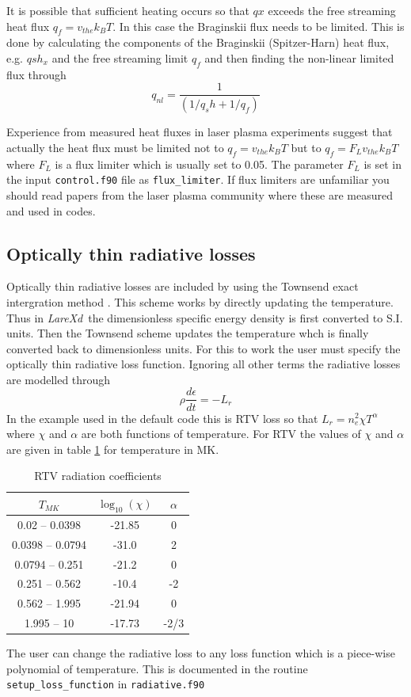 \documentclass[11pt]{article}
\newcommand{\lare}{{\it LareXd}\ }
\begin{document}
It is possible that sufficient heating occurs so that $qx$ exceeds the free streaming heat flux $q_f=v_{the} k_B T$. 
In this case the Braginskii flux needs to be limited. This is done by calculating the components of the Braginskii 
(Spitzer-Harn) heat flux, e.g. $qsh_x$ and the free streaming limit $q_f$ and then finding the non-linear limited flux through
\[
q_{nl} = \frac{1}{(1/q_sh + 1/q_f)}
\]

Experience from measured heat fluxes in laser plasma experiments suggest that actually the heat flux must be limited 
not to $q_f=v_{the} k_B T$ but to $q_f=F_L v_{the} k_B T$  where $F_L$ is a flux limiter which is usually set to 0.05. 
The parameter $F_L$ is set in the input \texttt{control.f90} file as \texttt{flux\_limiter}. If flux limiters are 
unfamiliar you should read papers from the laser plasma community where these are measured and used in codes.

\subsection*{Optically thin radiative losses}
Optically thin radiative losses are included by using the Townsend exact intergration method \cite{townsend:2009}.
This scheme works by directly updating the temperature. Thus in \lare the dimensionless specific energy density
is first converted to S.I. units. Then the Townsend scheme updates the temperature whch is finally converted back to
dimensionless units. For this to work the user must specify the optically thin radiative loss function.
Ignoring all other terms the radiative losses are modelled through
\[
\rho\frac{d\epsilon}{dt}=-L_r
\]
In the example used in the default code this is RTV loss so that $L_r=n_e^2 \chi T^{\alpha}$ where
$\chi$ and $\alpha$ are both functions of temperature. 
For RTV the values of $\chi$ and $\alpha$ are given in table \ref{table:rtv} for temperature in MK.
\begin{table}[ht]
\caption{RTV radiation coefficients}
\centering
\begin{tabular}{c c c}
\hline\hline
$T_{MK}$ & $\log_{10}(\chi)$ & $\alpha$ \\ [0.5ex] %
\hline
0.02 -- 0.0398   & -21.85 & 0 \\
0.0398 -- 0.0794 & -31.0 & 2 \\
0.0794 -- 0.251  & -21.2 & 0  \\
0.251 -- 0.562   & -10.4 & -2 \\
0.562 -- 1.995   & -21.94 & 0 \\
1.995 -- 10      & -17.73 & -2/3   \\[1ex]
\hline
\end{tabular}
\label{table:rtv}
\end{table}
The user can change the radiative loss to any loss function which is a piece-wise polynomial of
temperature. This is documented in the routine {\tt setup\_loss\_function} in {\tt radiative.f90} 
\end{document}
